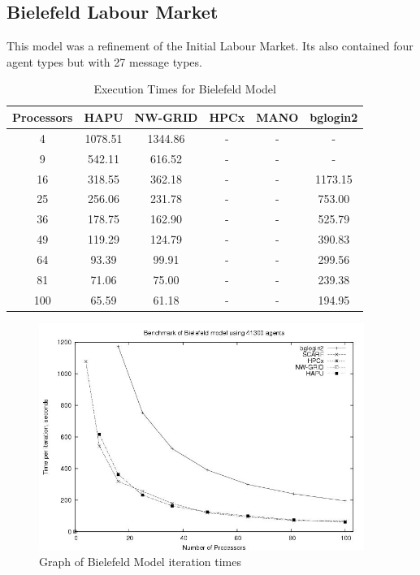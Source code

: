 \subsection{Bielefeld Labour Market}
This model was a refinement of the Initial Labour Market. Its also contained four agent types but with 27 message types.
{
\renewcommand{\arraystretch}{1.25}
\begin{table}[ht]
 \centering
  \begin{tabular}{c|ccccc}
 Processors &HAPU  &NW-GRID &HPCx  &MANO   &bglogin2 \\ \hline
4 &1078.51 &1344.86 &- &- &-    \\
9 &542.11 &616.52 &- &- &-      \\
16 &318.55 &362.18 &- &- &1173.15       \\
25 &256.06 &231.78 &- &- &753.00        \\
36 &178.75 &162.90 &- &- &525.79        \\
49 &119.29 &124.79 &- &- &390.83        \\
64 &93.39 &99.91 &- &- &299.56  \\
81 &71.06 &75.00 &- &- &239.38  \\
100 &65.59 &61.18 &- &- &194.95 \\
 \end{tabular}
 \caption{Execution Times for Bielefeld Model}
 \label{tab:ExecutionTimesForBielefeld}
\end{table}
}
\bigskip
\begin{figure}[ht]
 \centering
  \includegraphics[width=300pt]{Bielefeld2-graph.jpg}
 \caption{Graph of Bielefeld Model iteration times}
 \label{fig:Labour-graph2}
\end{figure}

